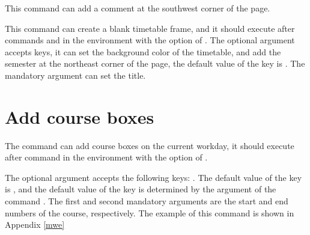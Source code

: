 \documentclass[letterpaper]{l3doc}
\begin{document}
\begin{function}{\more}
  \begin{syntax}
  \end{syntax}

  This command can add a comment at the southwest corner of the page.
\end{function}

\begin{function}{\maketable}
  \begin{syntax}
  \end{syntax}

  This command can create a blank timetable frame, and it should execute after commands  and  in the  environment with the option of . The optional argument accepts keys, it can set the background color of the timetable, and add the semester at the northeast corner of the page, the default value of the key  is . The mandatory argument can set the title.
\end{function}

\section{Add course boxes}

\begin{function}{\course}
  \begin{syntax}
  \end{syntax}
\end{function}

The  command can add course boxes on the current workday, it should execute after command  in the  environment with the option of .

The optional argument accepts the following keys:     . The default value of the key  is , and the default value of the key  is determined by the argument of the command . The first and second mandatory arguments are the start and end numbers of the course, respectively.  The example of this command is shown in Appendix \ref{mwe}
\end{document}
